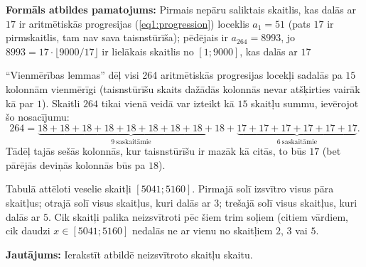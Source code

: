 \documentclass[a4paper,12pt]{article}
\newcommand\answer[1]{}
\begin{document}
\begin{problem}
{{\bf Formāls atbildes pamatojums:} 
Pirmais nepāru saliktais skaitlis, kas dalās ar $17$ ir aritmētiskās progresijas (\ref{eq1:progression}) loceklis
$a_1 = 51$  (pats $17$ ir pirmskaitlis, 
tam nav sava taisnstūrīša); pēdējais ir $a_{264} = 8993$, jo $8993 = 17\cdot \lfloor 9000/17 \rfloor$
ir lielākais skaitlis no $[1;9000]$, kas dalās ar $17$

``Vienmērības lemmas'' dēļ visi 264 aritmētiskās progresijas locekļi sadalās pa $15$ kolonnām vienmērīgi 
(taisnstūrīšu skaits dažādās kolonnās nevar atšķirties vairāk kā par $1$). Skaitli $264$ tikai vienā veidā
var izteikt kā $15$ skaitļu summu, ievērojot šo nosacījumu:
\[ 264 = \underbrace{18+18+18+18+18+18+18+18+18}_{9\ \text{saskaitāmie}} + \underbrace{17+17+17+17+17+17}_{6\ \text{saskaitāmie}}. \]
Tādēļ tajās sešās kolonnās, kur taisnstūrīšu ir mazāk kā citās, to būs $17$ (bet pārējās deviņās kolonnās būs pa $18$). 
}
\end{problem}





\vspace{20pt}
\begin{problem}
Tabulā attēloti veselie skaitļi $[5041;5160]$. 
Pirmajā solī izsvītro visus pāra skaitļus; otrajā solī \textendash{} visus skaitļus, 
kuri dalās ar $3$; trešajā solī \textendash{} visus skaitļus, kuri dalās ar $5$. 
Cik skaitļi palika neizsvītroti pēc šiem trim soļiem (citiem vārdiem, 
cik daudzi $x \in [5041;5160]$ nedalās ne ar vienu no skaitļiem $2$, $3$ vai $5$.

{\bf Jautājums:} Ierakstīt atbildē neizsvītroto skaitļu skaitu.
\answer{

{\bf Atbilde:} $\mathtt{32}$\\
Skaitļu intervāla garums ir $120$; no tā izsvītro visus tos skaitļus, kuriem ir 
kopīgi dalītāji ar $120$. Izsvītroto skaitļu daudzums nemainīsies, ja 
no katra intervāla skaitļa atņems nobīdi $5040$.

{\bf Apgalvojums.} Katram naturālam $x$, skaitlis $x + 5040$ dalās ar $2$
(attiecīgi ar $3$, vai ar $5$) tad un tikai tad, ja pats $x$ dalās ar $2$
(attiecīgi ar $3$, vai ar $5$). 

Apgalvojumu var pamatot ar to, ka pati nobīde $5040$ dalās ar $2 \cdot 3 \cdot 5 = 30$. 
Tāpēc neizsvītroto skaitļu būs pavisam 
\[ \varphi(120) = 120 \cdot \left( 1 - \frac{1}{2} \right) \cdot\left( 1 - \frac{1}{3}  \right) \cdot\left( 1 - \frac{1}{5}  \right) 
= 120 \cdot \frac{1}{2} \cdot \frac{2}{3} \cdot \frac{4}{5} = 32. \]
(Sākumā ir $120$ skaitļi, vispirms izsvītro katru otro (paliek puse), 
tad katru trešo (paliek divas trešdaļas no vēl neizsvītrotajiem) un visbeidzot katru piekto (paliek četras piektdaļas). 

}
\end{problem}
\end{document}
